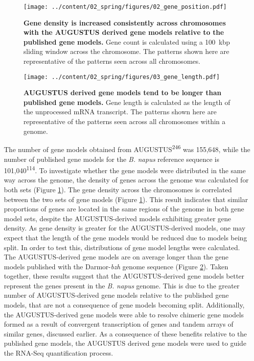 \documentclass[12pt,]{book}
\begin{document}
\begin{figure}[htbp]
\centering
\texttt{[image: ../content/02\_spring/figures/02\_gene\_position.pdf]}
\caption{\textbf{Gene density is increased consistently across
chromosomes with the AUGUSTUS derived gene models relative to the
published gene models.} Gene count is calculated using a 100~kbp sliding
window across the chromosome. The patterns shown here are representative
of the patterns seen across all
chromosomes.}\label{figure:202:geneposition}
\end{figure}

\begin{figure}[htbp]
\centering
\texttt{[image: ../content/02\_spring/figures/03\_gene\_length.pdf]}
\caption{\textbf{AUGUSTUS derived gene models tend to be longer than
published gene models.} Gene length is calculated as the length of the
unprocessed mRNA transcript. The patterns shown here are representative
of the patterns seen across all chromosomes within a
genome.}\label{figure:203:genelength}
\end{figure}

The number of gene models obtained from AUGUSTUS\textsuperscript{246}
was 155,648, while the number of published gene models for the \emph{B.
napus} reference sequence is 101,040\textsuperscript{114}. To
investigate whether the gene models were distributed in the same way
across the genome, the density of genes across the genome was calculated
for both sets (Figure \ref{figure:202:geneposition}). The gene density
across the chromosomes is correlated between the two sets of gene models
(Figure \ref{figure:202:geneposition}). This result indicates that
similar proportions of genes are located in the same regions of the
genome in both gene model sets, despite the AUGUSTUS-derived models
exhibiting greater gene density. As gene density is greater for the
AUGUSTUS-derived models, one may expect that the length of the gene
models would be reduced due to models being split. In order to test
this, distributions of gene model lengths were calculated. The
AUGUSTUS-derived gene models are on average longer than the gene models
published with the Darmor-\emph{bzh} genome sequence (Figure
\ref{figure:203:genelength}). Taken together, these results suggest that
the AUGUSTUS-derived gene models better represent the genes present in
the \emph{B. napus} genome. This is due to the greater number of
AUGUSTUS-derived gene models relative to the published gene models, that
are not a consequence of gene models becoming split. Additionally, the
AUGUSTUS-derived gene models were able to resolve chimeric gene models
formed as a result of convergent transcription of genes and tandem
arrays of similar genes, discussed earlier. As a consequence of these
benefits relative to the published gene models, the AUGUSTUS derived
gene models were used to guide the RNA-Seq quantification process.
\end{document}
